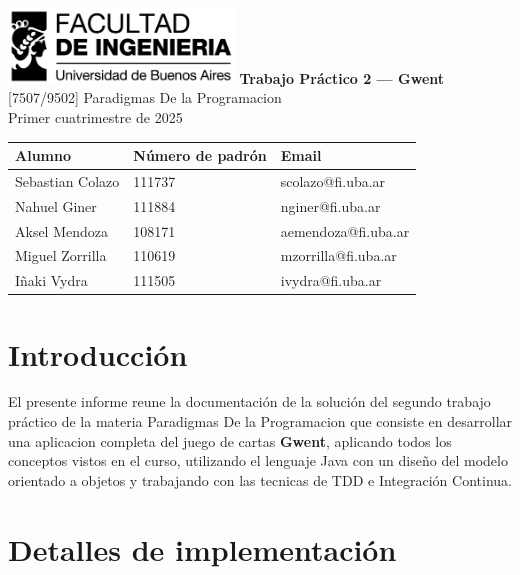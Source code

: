 \documentclass[titlepage,a4paper]{article}
\begin{document}
	\begin{titlepage} %
		\hfill\includegraphics[width=6cm]{logofiuba.jpg}
		\centering
		\vfill
		\Huge \textbf{Trabajo Práctico 2 — Gwent}
		\vskip2cm
		\Large [7507/9502] {Paradigmas De la Programacion}\\
		Primer cuatrimestre de 2025 %
		\vfill
		\begin{tabular}{ | l | l | l | } %
			\hline
			\textbf{Alumno} & \textbf{Número de padrón} & \textbf{Email} \\ \hline
			Sebastian Colazo & 111737 & scolazo@fi.uba.ar \\ \hline
			Nahuel Giner & 111884 & nginer@fi.uba.ar\\ \hline
			Aksel Mendoza & 108171 & aemendoza@fi.uba.ar \\ \hline
			Miguel Zorrilla & 110619 & mzorrilla@fi.uba.ar  \\ \hline
			Iñaki Vydra & 111505 & ivydra@fi.uba.ar \\ \hline
		\end{tabular}
		\vfill
	\end{titlepage}
	
	\tableofcontents %
	\newpage
	
	\section{Introducción}\label{sec:intro}
	El presente informe reune la documentación de la solución del segundo trabajo práctico de la materia Paradigmas De la Programacion que consiste en desarrollar una aplicacion completa del juego de cartas \textbf{Gwent}, aplicando todos los conceptos vistos en
	el curso, utilizando el lenguaje Java con un diseño del modelo orientado a objetos y trabajando con las tecnicas de TDD e Integración Continua.


	\section{Detalles de implementación}\label{sec:implementacion}
\end{document}
